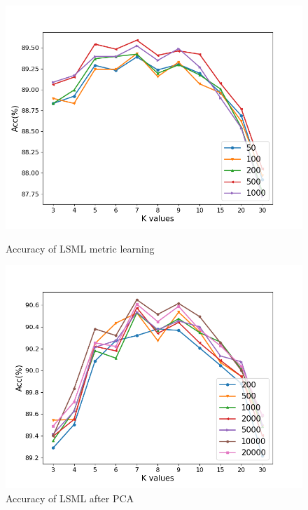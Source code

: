 \begin{figure}
    \centering
    \begin{minipage}[t]{0.48\linewidth}
        \centering
        \includegraphics[width=1.0\linewidth]{img/LSML.png}
        \caption{Accuracy of LSML metric learning}
        \label{fig:lsml}
    \end{minipage}
    \begin{minipage}[t]{0.48\linewidth}
        \centering
        \includegraphics[width=1.0\linewidth]{img/LSML-PCA.png}
        \caption{Accuracy of LSML after PCA}
        \label{fig:lsml-pca}
    \end{minipage}
\end{figure}



